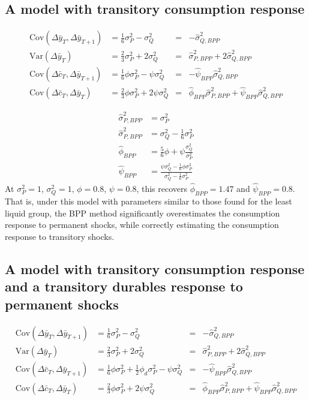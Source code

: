 \documentclass[12pt]{article}
\begin{document}
\subsection{A model with transitory consumption response}
\begin{align*}
	\mathrm{Cov}(\Delta \bar{y}_T, \Delta \bar{y}_{T+1}) &= \frac{1}{6} \sigma^2_P - \sigma^2_Q &= &-\hat{\sigma}^2_{Q,BPP} \\
	\mathrm{Var}(\Delta \bar{y}_T) &= \frac{2}{3} \sigma^2_P + 2\sigma^2_Q &= &\hat{\sigma}^2_{P,BPP} + 2\hat{\sigma}^2_{Q,BPP} \\
	\mathrm{Cov}(\Delta \bar{c}_T, \Delta \bar{y}_{T+1}) &= \frac{1}{6} \phi \sigma^2_P - \psi \sigma^2_Q &= &-\hat{\psi}_{BPP} \hat{\sigma}^2_{Q,BPP} \\
\mathrm{Cov}(\Delta \bar{c}_T, \Delta \bar{y}_T) &= \frac{2}{3} \phi \sigma^2_P + 2\psi \sigma^2_Q &= &\hat{\phi}_{BPP}\hat{\sigma}^2_{P,BPP} +\hat{\psi}_{BPP}\hat{\sigma}^2_{Q,BPP}
\end{align*}

\begin{align*}
	\hat{\sigma}^2_{P,BPP} &= \sigma^2_P \\
	\hat{\sigma}^2_{P,BPP} &= \sigma^2_Q - \frac{1}{6}\sigma^2_P \\
	\hat{\phi}_{BPP} &=  \frac{5}{6}\phi + \psi\frac{\sigma^2_Q}{\sigma^2_P}\\
	\hat{\psi}_{BPP} &=  \frac{\psi \sigma^2_Q - \frac{1}{6} \phi \sigma^2_P  }{\sigma^2_Q - \frac{1}{6} \sigma^2_P}
\end{align*}
At $\sigma^2_P=1$, $\sigma^2_Q=1$, $\phi=0.8$, $\psi=0.8$, this recovers $\hat{\phi}_{BPP}=1.47$ and $\hat{\psi}_{BPP}=0.8$. That is, under this model with parameters similar to those found for the least liquid group, the BPP method significantly overestimates the consumption response to permanent shocks, while correctly estimating the consumption response to transitory shocks.

\subsection{A model with transitory consumption response and a transitory durables response to permanent shocks}
\begin{align*}
	\mathrm{Cov}(\Delta \bar{y}_T, \Delta \bar{y}_{T+1}) &= \frac{1}{6} \sigma^2_P - \sigma^2_Q &= &-\hat{\sigma}^2_{Q,BPP} \\
	\mathrm{Var}(\Delta \bar{y}_T) &= \frac{2}{3} \sigma^2_P + 2\sigma^2_Q &= &\hat{\sigma}^2_{P,BPP} + 2\hat{\sigma}^2_{Q,BPP} \\
	\mathrm{Cov}(\Delta \bar{c}_T, \Delta \bar{y}_{T+1}) &= \frac{1}{6} \phi \sigma^2_P +\frac{1}{2}\phi_d\sigma^2_P- \psi \sigma^2_Q &= &-\hat{\psi}_{BPP} \hat{\sigma}^2_{Q,BPP} \\
	\mathrm{Cov}(\Delta \bar{c}_T, \Delta \bar{y}_T) &= \frac{2}{3} \phi \sigma^2_P + 2\psi \sigma^2_Q &= &\hat{\phi}_{BPP}\hat{\sigma}^2_{P,BPP} +\hat{\psi}_{BPP}\hat{\sigma}^2_{Q,BPP}
\end{align*}
\end{document}
